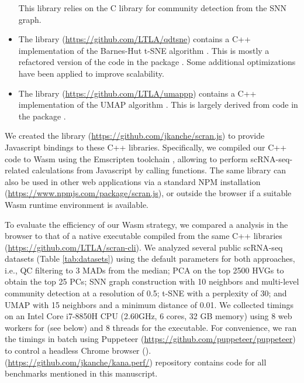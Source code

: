 \documentclass{article}
\begin{document}
\begin{itemize}
This library relies on the  C library \cite{csardi2006igraph} for community detection from the SNN graph.
\item The  library (\url{https://github.com/LTLA/qdtsne}) contains a C++ implementation of the Barnes-Hut t-SNE algorithm \cite{maaten2014accelerating}.
This is mostly a refactored version of the code in the  package \cite{rtsne}.
Some additional optimizations have been applied to improve scalability.
\item The  library (\url{https://github.com/LTLA/umappp}) contains a C++ implementation of the UMAP algorithm \cite{mcinnes2018umap}.
This is largely derived from code in the  package \cite{uwot}.
\end{itemize}

We created the  library (\url{https://github.com/jkanche/scran.js}) to provide Javascript bindings to these C++ libraries.
Specifically, we compiled our C++ code to Wasm using the Emscripten toolchain \cite{zakai2011emscripten},
allowing  to perform scRNA-seq-related calculations from Javascript by calling  functions.
The same library can also be used in other web applications via a standard NPM installation (\url{https://www.npmjs.com/package/scran.js}),
or outside the browser if a suitable Wasm runtime environment is available.

To evaluate the efficiency of our Wasm strategy, 
we compared a  analysis in the browser to that of a native executable compiled from the same C++ libraries (\url{https://github.com/LTLA/scran-cli}).
We analyzed several public scRNA-seq datasets (Table \ref{tab:datasets}) using the default  parameters for both approaches, i.e.,
QC filtering to 3 MADs from the median;
PCA on the top 2500 HVGs to obtain the top 25 PCs;
SNN graph construction with 10 neighbors and multi-level community detection at a resolution of 0.5;
t-SNE with a perplexity of 30;
and UMAP with 15 neighbors and a minimum distance of 0.01.
We collected timings on an Intel Core i7-8850H CPU (2.60GHz, 6 cores, 32 GB memory)  using 8 web workers for  (see below) and 8 threads for the executable.
For convenience, we ran the  timings in batch using Puppeteer (\url{https://github.com/puppeteer/puppeteer}) to control a headless Chrome browser (). 
(\url{https://github.com/jkanche/kana.perf/}) repository contains code for all benchmarks mentioned in this manuscript.
\end{document}
